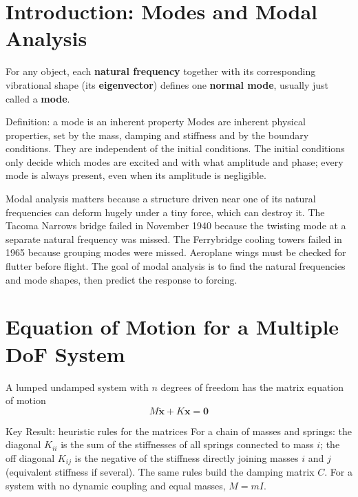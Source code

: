 \documentclass[10pt,a4paper]{article}
\begin{document}
\notestitle

\tableofcontents
\newpage

\section{Introduction: Modes and Modal Analysis}
For any object, each \textbf{natural frequency} together with its corresponding vibrational shape (its \textbf{eigenvector}) defines one \textbf{normal mode}, usually just called a \textbf{mode}.

\begin{defbox}{Definition: a mode is an inherent property}
Modes are inherent physical properties, set by the mass, damping and stiffness and by the boundary conditions. They are independent of the initial conditions. The initial conditions only decide which modes are excited and with what amplitude and phase; every mode is always present, even when its amplitude is negligible.
\end{defbox}

Modal analysis matters because a structure driven near one of its natural frequencies can deform hugely under a tiny force, which can destroy it. The Tacoma Narrows bridge failed in November 1940 because the twisting mode at a separate natural frequency was missed. The Ferrybridge cooling towers failed in 1965 because grouping modes were missed. Aeroplane wings must be checked for flutter before flight. The goal of modal analysis is to find the natural frequencies and mode shapes, then predict the response to forcing.

\section{Equation of Motion for a Multiple DoF System}
A lumped undamped system with $n$ degrees of freedom has the matrix equation of motion
\begin{equation}
  M\ddot{\mathbf{x}} + K\mathbf{x} = \mathbf{0}
\end{equation}
\begin{varlist}
\end{varlist}

\begin{keybox}{Key Result: heuristic rules for the matrices}
For a chain of masses and springs: the diagonal $K_{ii}$ is the sum of the stiffnesses of all springs connected to mass $i$; the off diagonal $K_{ij}$ is the negative of the stiffness directly joining masses $i$ and $j$ (equivalent stiffness if several). The same rules build the damping matrix $C$. For a system with no dynamic coupling and equal masses, $M = mI$.
\end{keybox}
\end{document}
